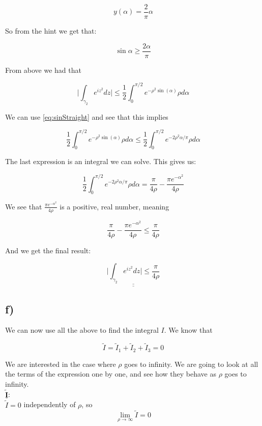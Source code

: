 \documentclass[a4paper,norsk, 10pt]{article}
\begin{document}
$$
y(\alpha) = \frac{2}{\pi}\alpha
$$

So from the hint we get that:

\begin{equation}
\sin \alpha \geq \frac{2\alpha}{\pi}
\label{eq:sinStraight}
\end{equation}

From above we had that 

$$
\big| \int_{\gamma_2}e^{iz^2} dz \big| \leq \frac{1}{2}\int_0^{\pi/2} e^{-\rho^2 \sin(\alpha)}\rho d\alpha
$$

We can use \ref{eq:sinStraight} and see that this implies 

$$
\frac{1}{2}\int_0^{\pi/2} e^{-\rho^2 \sin(\alpha)}\rho d\alpha \leq \frac{1}{2}\int_0^{\pi/2} e^{-2\rho^2 \alpha/\pi}\rho d\alpha
$$

The last expression is an integral we can solve. This gives us:

$$
\frac{1}{2}\int_0^{\pi/2} e^{-2\rho^2 \alpha/\pi}\rho d\alpha = \frac{\pi}{4\rho} - \frac{\pi e^{-\alpha^2}}{4\rho}
$$

We see that $\frac{\pi e^{-\alpha^2}}{4\rho}$ is a positive, real number, meaning 

$$
\frac{\pi}{4\rho} - \frac{\pi e^{-\alpha^2}}{4\rho} \leq  \frac{\pi}{4\rho}
$$

And we get the final result:

\begin{equation}
\underline{\underline{\big| \int_{\gamma_2}e^{iz^2} dz \big| \leq \frac{\pi}{4\rho}}}
\label{eq:I2}
\end{equation}



\subsection*{f)}

We can now use all the above to find the integral $I$. We know that

$$
\tilde{I} = \tilde{I}_1 + \tilde{I}_2 + \tilde{I}_3 = 0
$$

We are interested in the case where $\rho$ goes to infinity. We are going to look at all the terms of the expression one by one, and see how they behave as $\rho$ goes to infinity.\\

$\underline{\mathbf{\tilde{I}}}$:\\

$\tilde{I} = 0$ independently of $\rho$, so
\begin{equation}
\lim_{\rho \rightarrow \infty} \tilde{I} = 0
\label{eq:IrhoInf}
\end{equation}\\
\end{document}
